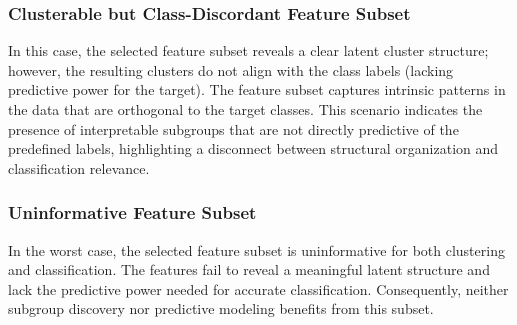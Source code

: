 \documentclass[a4paper,12pt]{article}
\begin{document}
\subsubsection{Clusterable but Class-Discordant Feature Subset}
In this case, the selected feature subset reveals a clear latent cluster structure;
however, the resulting clusters do not align with the class labels (lacking 
predictive power for the target). The feature subset captures intrinsic patterns 
in the data that are orthogonal to the target classes. This scenario indicates 
the presence of interpretable subgroups that are not directly predictive of the 
predefined labels, highlighting a disconnect between structural organization 
and classification relevance.

\subsubsection{Uninformative Feature Subset}
In the worst case, the selected feature subset is uninformative for both clustering
and classification. The features fail to reveal a meaningful latent structure
and lack the predictive power needed for accurate classification. Consequently,
neither subgroup discovery nor predictive modeling benefits from this subset.



\newpage
\end{document}
